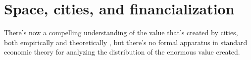 


\section{Space, cities, and financialization}

There's now a compelling understanding of the value that's created by cities, both empirically and theoretically \cite{jacobsEconomyCities1969, spenceUrbanizationGrowth2009, bettencourtIntroductionUrbanScience2021}, but there's no formal apparatus in standard economic theory for analyzing the distribution of the enormous value created. %









